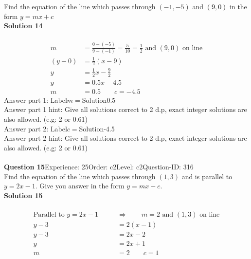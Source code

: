 \documentclass{article}
\begin{document}
Find the equation of the line which passes through $(-1,-5)$ and $(9,0)$ in the form $y=mx+c$\\[4pt]
\noindent\textbf{Solution 14}\\[2pt]
\\[-35pt]\begin{align*}
m&=\displaystyle\frac{0-(-5)}{9-(-1)}=\displaystyle\frac{5}{10}=\displaystyle\frac{1}{2} \,\,\text{and}\,\, (9,0) \,\,\text{on line}\\[2pt]
(y-0)&=\displaystyle\frac{1}{2}(x-9)\\[2pt]
y&=\displaystyle\frac{1}{2}x-\displaystyle\frac{9}{2}\\[2pt]
y&=0.5x-4.5\\[2pt]
m&=0.5 \qquad c=-4.5
\end{align*}
Answer part 1: \hspace{10pt}Label\hspace{10pt}$m=$\hspace{10pt}Solution\hspace{10pt}0.5\\
Answer part 1 hint: \hspace{15pt}Give all solutions correct to 2 d.p, exact integer solutions are also allowed. (e.g: 2 or 0.61)\\
Answer part 2: \hspace{10pt}Label\hspace{10pt}$c=$\hspace{10pt}Solution\hspace{10pt}-4.5\\
Answer part 2 hint: \hspace{15pt}Give all solutions correct to 2 d.p, exact integer solutions are also allowed. (e.g: 2 or 0.61)\\
\\[4pt]
\noindent\textbf{Question 15}\hspace{20pt}Experience: 25\hspace{20pt}Order: c2\hspace{20pt}Level: c2\hspace{20pt}Question-ID: 316\\[2pt]
Find the equation of the line which passes through $(1,3)$ and is parallel to $y=2x-1$. Give you answer in the form $y=mx+c$.\\[4pt]
\noindent\textbf{Solution 15}\\[2pt]
\\[-35pt]\begin{align*}
\text{Parallel to}\,\,y=2x-1\qquad &\Rightarrow \qquad m=2\,\, \text{and}\,\, (1,3)\,\, \text{on line}\\[2pt]
y-3&=2(x-1)\\[2pt]
y-3&=2x-2\\[2pt]
y&=2x+1\\[2pt]
m&=2\qquad c=1
\end{align*}
\end{document}
